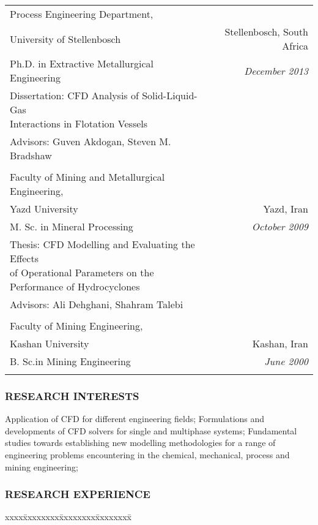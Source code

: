 \documentclass[10pt,a4]{article}
\newcommand{\quotes}[1]{``#1''}
\begin{document}
\begin{small}
\begin{tabbing}
\begin{tabular*}{0.97\linewidth}{l@{\extracolsep{\fill}}r}
Process Engineering Department, \\
University of Stellenbosch & Stellenbosch, South Africa\\
Ph.D. in  Extractive Metallurgical Engineering & 
{\it December 2013}\\
Dissertation: \quotes{CFD Analysis of Solid-Liquid-Gas \\Interactions in Flotation Vessels}\\
Advisors: Guven Akdogan, Steven M. Bradshaw \\
 & \\

Faculty of Mining and Metallurgical Engineering, \\
Yazd University & Yazd, Iran \\
M. Sc. in Mineral Processing &
{\it October 2009} \\
Thesis: \quotes{CFD Modelling and Evaluating the Effects \\of Operational Parameters
on the Performance of Hydrocyclones}\\
Advisors: Ali Dehghani, Shahram Talebi \\
 & \\

Faculty of Mining Engineering, \\
Kashan University & Kashan, Iran \\
B. Sc.in Mining Engineering &
{\it June 2000}\\
 & \\

\end{tabular*}
\end{tabbing}


\subsubsection*{RESEARCH INTERESTS}

\begin{list}{}{}
\item Application of CFD for different engineering fields; Formulations and developments of CFD solvers for single and multiphase systems; Fundamental studies towards establishing new modelling methodologies for a range of engineering problems encountering in the chemical, mechanical, process and mining engineering; 
\end{list}

\subsubsection*{RESEARCH EXPERIENCE}
%
\begin{tabbing}
xxxx\=xxxxxxxx\=xxxxxxxx\=xxxxxxxx\=\kill


\end{tabbing}
\end{small}
\end{document}
